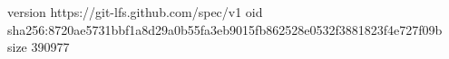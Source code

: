 version https://git-lfs.github.com/spec/v1
oid sha256:8720ae5731bbf1a8d29a0b55fa3eb9015fb862528e0532f3881823f4e727f09b
size 390977
